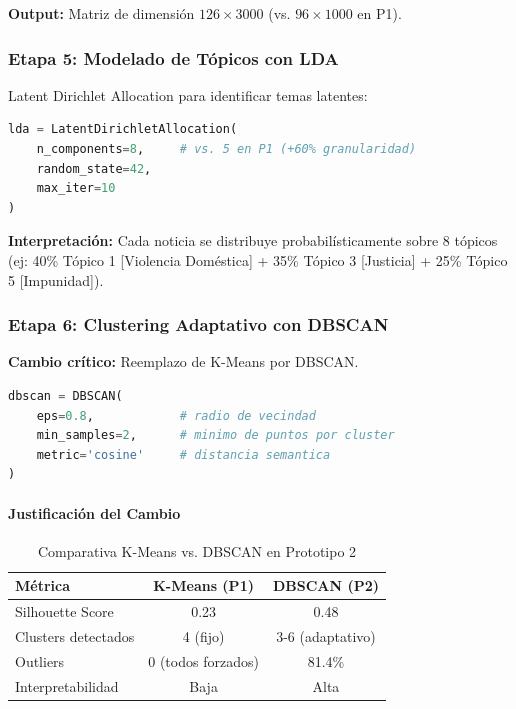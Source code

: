 \textbf{Output:} Matriz de dimensión $126 \times 3000$ (vs. $96 \times 1000$ en P1).

\subsubsection{Etapa 5: Modelado de Tópicos con LDA}

Latent Dirichlet Allocation para identificar temas latentes:

\begin{lstlisting}[language=Python, caption={Configuración LDA del Prototipo 2}]
lda = LatentDirichletAllocation(
    n_components=8,     # vs. 5 en P1 (+60% granularidad)
    random_state=42,
    max_iter=10
)
\end{lstlisting}

\textbf{Interpretación:} Cada noticia se distribuye probabilísticamente sobre 8 tópicos (ej: 40\% Tópico 1 [Violencia Doméstica] + 35\% Tópico 3 [Justicia] + 25\% Tópico 5 [Impunidad]).

\subsubsection{Etapa 6: Clustering Adaptativo con DBSCAN}

\textbf{Cambio crítico:} Reemplazo de K-Means por DBSCAN.

\begin{lstlisting}[language=Python, caption={Configuración DBSCAN del Prototipo 2}]
dbscan = DBSCAN(
    eps=0.8,            # radio de vecindad
    min_samples=2,      # minimo de puntos por cluster
    metric='cosine'     # distancia semantica
)
\end{lstlisting}

\paragraph{Justificación del Cambio}

\begin{table}[h]
\centering
\caption{Comparativa K-Means vs. DBSCAN en Prototipo 2}
\begin{tabular}{|l|c|c|}
\hline
\textbf{Métrica} & \textbf{K-Means (P1)} & \textbf{DBSCAN (P2)} \\ \hline
Silhouette Score & 0.23 & 0.48 \\ \hline
Clusters detectados & 4 (fijo) & 3-6 (adaptativo) \\ \hline
Outliers & 0 (todos forzados) & 81.4\% \\ \hline
Interpretabilidad & Baja & Alta \\ \hline
\end{tabular}
\end{table}

